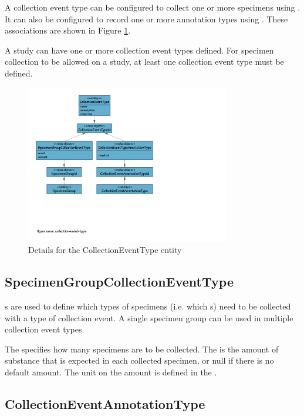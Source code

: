 A collection event type can be configured to collect one or more specimens using
. It can also be configured to
record one or more annotation types using
. These associations are shown in
Figure \ref{fig:collection-event-type}.

A study can have one or more collection event types defined. For specimen
collection to be allowed on a study, at least one collection event type must be
defined.

\begin{figure}[H]
  \centering
  \includegraphics[trim={9mm 65mm 96mm 9mm}, clip,
    width=0.8\textwidth]{images/collection-event-type}
  \caption{Details for the CollectionEventType entity}
  \label{fig:collection-event-type}
\end{figure}

\subsection*{SpecimenGroupCollectionEventType}

s are used to define which types
of specimens (i.e. which s) need to be collected with
a type of collection event. A single specimen group can be used in multiple
collection event types.

The  specifies how many specimens are to be collected. The
 is the amount of substance that is expected in each collected
specimen, or null if there is no default amount. The unit on the amount is
defined in the .

\subsection*{CollectionEventAnnotationType}

